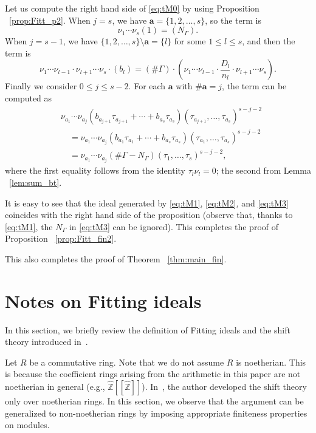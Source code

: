 \documentclass[11pt]{article}
\theoremstyle{definition}
\numberwithin{equation}{section}
\newcommand{\Z}{\mathbb{Z}}
\newcommand{\hZ}{\hat{\Z}}
\begin{document}
Let us compute the right hand side of \eqref{eq:tM0} by using Proposition ~\ref{prop:Fitt_p2}.
When $j = s$, we have $\bm{a} = \{1, 2, \dots, s\}$, so the term is 
\begin{equation}\label{eq:tM1}
\nu_1 \cdots \nu_s (1) = (N_{\Gamma}).
\end{equation}
When $j = s - 1$, we have $\{1, 2, \dots, s\} \setminus \bm{a} = \{ l \}$ for some $1 \leq l \leq s$, and then the term is
\begin{equation}\label{eq:tM2}
\nu_1 \cdots \nu_{l-1} \cdot \nu_{l+1} \cdots \nu_s \cdot (b_l)
= (\# \Gamma) \cdot \left( \nu_1 \cdots \nu_{l-1} \cdot \frac{D_l}{n_l} \cdot \nu_{l+1} \cdots \nu_s \right).
\end{equation}
Finally we consider $0 \leq j \leq s - 2$.
For each $\bm{a}$ with $\# \bm{a} = j$, the term can be computed as
\begin{align}\label{eq:tM3}
& \nu_{a_1} \cdots \nu_{a_j} \left( b_{a_{j+1}} \tau_{a_{j+1}} + \cdots + b_{a_s} \tau_{a_s} \right)(\tau_{a_{j+1}}, \dots, \tau_{a_s})^{s - j - 2}\\
& \quad = \nu_{a_1} \cdots \nu_{a_j} \left( b_{a_1} \tau_{a_1} + \cdots + b_{a_s} \tau_{a_s} \right)(\tau_{a_{1}}, \dots, \tau_{a_s})^{s - j - 2}\\
& \quad = \nu_{a_1} \cdots \nu_{a_j} ( \# \Gamma - N_{\Gamma}) (\tau_1, \dots, \tau_s)^{s - j - 2},
\end{align}
where the first equality follows from the identity $\tau_l \nu_l = 0$; the second from Lemma ~\ref{lem:sum_bt}.

It is easy to see that the ideal generated by \eqref{eq:tM1}, \eqref{eq:tM2}, and \eqref{eq:tM3} coincides with the right hand side of the proposition (observe that, thanks to \eqref{eq:tM1}, the $N_{\Gamma}$ in \eqref{eq:tM3} can be ignored).
This completes the proof of Proposition ~\ref{prop:Fitt_fin2}.

This also completes the proof of Theorem ~\ref{thm:main_fin}.
\appendix

\section{Notes on Fitting ideals}\label{sec:Fitt_gen}

In this section, we briefly review the definition of Fitting ideals and the shift theory introduced in~\cite{Kata_05}.

Let $R$ be a commutative ring.
Note that we do not assume $R$ is noetherian.
This is because the coefficient rings arising from the arithmetic in this paper are not noetherian in general (e.g., $\hZ[[\hZ]]$).
In~\cite{Kata_05}, the author developed the shift theory only over noetherian rings.
In this section, we observe that the argument can be generalized to non-noetherian rings by imposing appropriate finiteness properties on modules.
\end{document}
